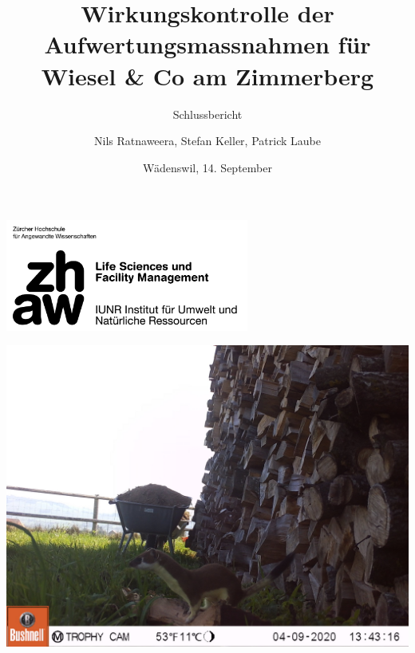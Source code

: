 \documentclass[
  oneside]{scrbook}
\title{Wirkungskontrolle der Aufwertungsmassnahmen für Wiesel \& Co am Zimmerberg}
\subtitle{Schlussbericht}
\author{Nils Ratnaweera, Stefan Keller, Patrick Laube}
\date{Wädenswil, 14. September}
\begin{document}
\maketitle


\makeatletter
\begin{titlepage}

\thispagestyle{empty}
\includegraphics[width=0.6\textwidth]{images/zhaw_lsfm_iunr_schwarz.jpg}

\begin{center}

\includegraphics{images/Hermelin_Str116_WK02.JPG}

\vspace{10pt}

{\huge \@title}

\vspace{30pt}

% 



\end{center}



\begin{flushleft}

\begin{minipage}{21cm}
\vspace{10cm}



\end{minipage}
\end{flushleft}
\end{titlepage}
\end{document}
